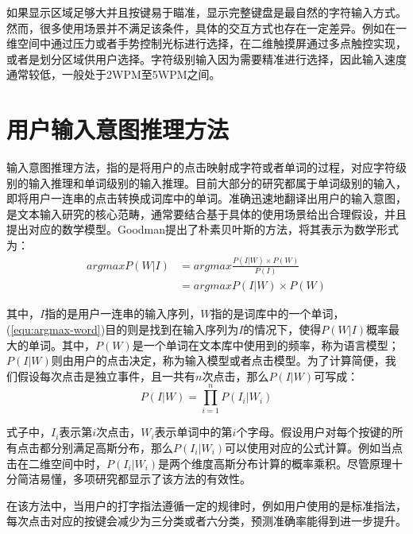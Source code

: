 如果显示区域足够大并且按键易于瞄准，显示完整键盘是最自然的字符输入方式。然而，很多使用场景并不满足该条件，具体的交互方式也存在一定差异。例如在一维空间中通过压力\cite{2018forceboard}或者手势\cite{1dhandwriting}控制光标进行选择，在二维触摸屏通过多点触控实现\cite{bonner2010no}，或者是划分区域供用户选择\cite{banovic2013escape}。字符级别输入因为需要精准进行选择，因此输入速度通常较低，一般处于2WPM至5WPM之间。

\section{用户输入意图推理方法}
输入意图推理方法，指的是将用户的点击映射成字符或者单词的过程，对应字符级别的输入推理和单词级别的输入推理。目前大部分的研究都属于单词级别的输入，即将用户一连串的点击转换成词库中的单词。准确迅速地翻译出用户的输入意图，是文本输入研究的核心范畴，通常要结合基于具体的使用场景给出合理假设，并且提出对应的数学模型。Goodman\cite{language2002goodman}提出了朴素贝叶斯的方法，将其表示为数学形式为：
\begin{equation}
    \label{equ:argmax-word}
    \begin{aligned}
    argmax P(W|I) &= argmax \frac{P(I|W) \times P(W)}{P(I)} \\
                  &= argmax P(I|W) \times P(W)
    \end{aligned}
\end{equation}

其中，$I$指的是用户一连串的输入序列，$W$指的是词库中的一个单词，(\ref{equ:argmax-word})目的则是找到在输入序列为$I$的情况下，使得$P(W|I)$概率最大的单词。其中，$P(W)$是一个单词在文本库中使用到的频率，称为语言模型；$P(I|W)$则由用户的点击决定，称为输入模型或者点击模型。为了计算简便，我们假设每次点击是独立事件，且一共有$n$次点击，那么$P(I|W)$可写成：
\begin{equation}
    P(I|W) = \prod_{i=1}^{n}P(I_i|W_i)
\end{equation}

式子中，$I_i$表示第$i$次点击，$W_i$表示单词中的第$i$个字母。假设用户对每个按键的所有点击都分别满足高斯分布，那么$P(I_i|W_i)$可以使用对应的公式计算。例如当点击在二维空间中时，$P(I_i|W_i)$是两个维度高斯分布计算的概率乘积。尽管原理十分简洁易懂，多项研究\cite{2017blindtype}\cite{2015atk}\cite{2018forceboard}都显示了该方法的有效性。

在该方法中，当用户的打字指法遵循一定的规律时，例如用户使用的是标准指法\cite{2015atk}，每次点击对应的按键会减少为三分类或者六分类，预测准确率能得到进一步提升。

